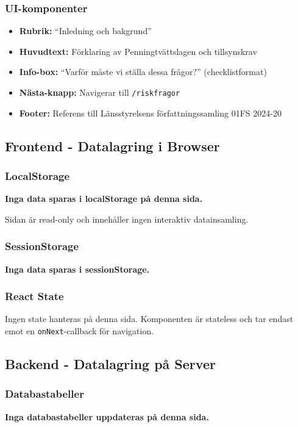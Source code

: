 \documentclass[12pt,a4paper]{article}
\begin{document}
\subsubsection{UI-komponenter}
\begin{itemize}[noitemsep]
  \item \textbf{Rubrik:} ``Inledning och bakgrund''
  \item \textbf{Huvudtext:} Förklaring av Penningtvättslagen och tillsynskrav
  \item \textbf{Info-box:} ``Varför måste vi ställa dessa frågor?'' (checklistformat)
  \item \textbf{Nästa-knapp:} Navigerar till \texttt{/riskfragor}
  \item \textbf{Footer:} Referens till Länsstyrelsens författningssamling 01FS 2024-20
\end{itemize}

\subsection{Frontend - Datalagring i Browser}

\subsubsection{LocalStorage}
\textbf{Inga data sparas i localStorage på denna sida.}

Sidan är read-only och innehåller ingen interaktiv datainsamling.

\subsubsection{SessionStorage}
\textbf{Inga data sparas i sessionStorage.}

\subsubsection{React State}
Ingen state hanteras på denna sida. Komponenten är stateless och tar endast emot en \texttt{onNext}-callback för navigation.

\subsection{Backend - Datalagring på Server}

\subsubsection{Databastabeller}
\textbf{Inga databastabeller uppdateras på denna sida.}
\end{document}
